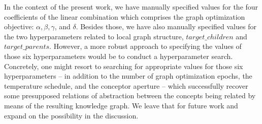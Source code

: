 In the context of the present work, we have manually specified values for the four coefficients of the linear combination which comprises the graph optimization objective: $\alpha, \beta, \gamma$, and $\delta$. Besides those, we have also manually specified values for the two hyperparameters related to local graph structure, $target\_children$ and $target\_parents$. However, a more robust approach to specifying the values of those six hyperparameters would be to conduct a hyperparameter search. Concretely, one might resort to searching for appropriate values for those six hyperparameters -- in addition to the number of graph optimization epochs, the temperature schedule, and the conceptor aperture -- which successfully recover some presupposed relations of abstraction between the concepts being related by means of the resulting knowledge graph. We leave that for future work and expand on the possibility in the discussion.
